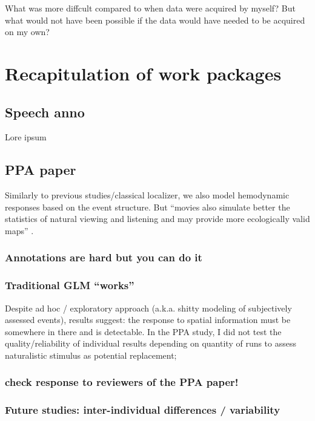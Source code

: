 %
What was more diffcult compared to when data were acquired by myself?
%
But what would not have been possible if the data would have needed to be
acquired on my own?



\section{Recapitulation of work packages}


\subsection{Speech anno}

Lore ipsum

\subsection{PPA paper}
%
Similarly to previous studies/classical localizer, we also model hemodynamic
responses based on the event structure.
%
But ``movies also simulate better the statistics of natural viewing and
listening and may provide more ecologically valid maps''
\citep{jiahui2020predicting}.

\subsubsection{Annotations are hard but you can do it}

\subsubsection{Traditional GLM ``works''}

%
Despite ad hoc / exploratory approach (a.k.a. shitty modeling of subjectively
assessed events), results suggest: the response to spatial information must be
somewhere in there and is detectable.
%
In the PPA study,  I did not test the quality/reliability of individual results
depending on quantity of runs to assess naturalistic stimulus as potential
replacement;


\subsubsection{check response to reviewers of the PPA paper!}


\subsubsection{Future studies: inter-individual differences / variability}

